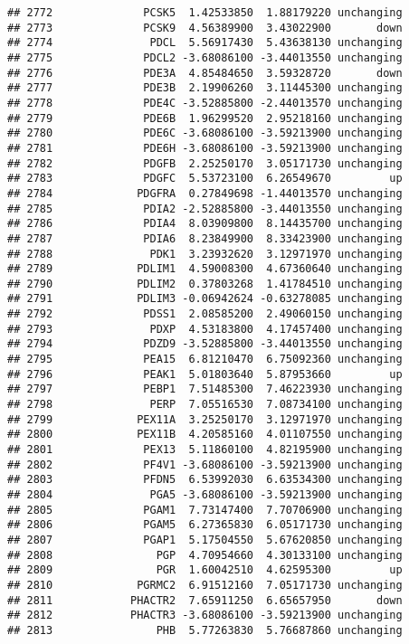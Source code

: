 \documentclass[]{article}
\begin{document}
\begin{verbatim}
## 2772              PCSK5  1.42533850  1.88179220 unchanging
## 2773              PCSK9  4.56389900  3.43022900       down
## 2774               PDCL  5.56917430  5.43638130 unchanging
## 2775              PDCL2 -3.68086100 -3.44013550 unchanging
## 2776              PDE3A  4.85484650  3.59328720       down
## 2777              PDE3B  2.19906260  3.11445300 unchanging
## 2778              PDE4C -3.52885800 -2.44013570 unchanging
## 2779              PDE6B  1.96299520  2.95218160 unchanging
## 2780              PDE6C -3.68086100 -3.59213900 unchanging
## 2781              PDE6H -3.68086100 -3.59213900 unchanging
## 2782              PDGFB  2.25250170  3.05171730 unchanging
## 2783              PDGFC  5.53723100  6.26549670         up
## 2784             PDGFRA  0.27849698 -1.44013570 unchanging
## 2785              PDIA2 -2.52885800 -3.44013550 unchanging
## 2786              PDIA4  8.03909800  8.14435700 unchanging
## 2787              PDIA6  8.23849900  8.33423900 unchanging
## 2788               PDK1  3.23932620  3.12971970 unchanging
## 2789             PDLIM1  4.59008300  4.67360640 unchanging
## 2790             PDLIM2  0.37803268  1.41784510 unchanging
## 2791             PDLIM3 -0.06942624 -0.63278085 unchanging
## 2792              PDSS1  2.08585200  2.49060150 unchanging
## 2793               PDXP  4.53183800  4.17457400 unchanging
## 2794              PDZD9 -3.52885800 -3.44013550 unchanging
## 2795              PEA15  6.81210470  6.75092360 unchanging
## 2796              PEAK1  5.01803640  5.87953660         up
## 2797              PEBP1  7.51485300  7.46223930 unchanging
## 2798               PERP  7.05516530  7.08734100 unchanging
## 2799             PEX11A  3.25250170  3.12971970 unchanging
## 2800             PEX11B  4.20585160  4.01107550 unchanging
## 2801              PEX13  5.11860100  4.82195900 unchanging
## 2802              PF4V1 -3.68086100 -3.59213900 unchanging
## 2803              PFDN5  6.53992030  6.63534300 unchanging
## 2804               PGA5 -3.68086100 -3.59213900 unchanging
## 2805              PGAM1  7.73147400  7.70706900 unchanging
## 2806              PGAM5  6.27365830  6.05171730 unchanging
## 2807              PGAP1  5.17504550  5.67620850 unchanging
## 2808                PGP  4.70954660  4.30133100 unchanging
## 2809                PGR  1.60042510  4.62595300         up
## 2810             PGRMC2  6.91512160  7.05171730 unchanging
## 2811            PHACTR2  7.65911250  6.65657950       down
## 2812            PHACTR3 -3.68086100 -3.59213900 unchanging
## 2813                PHB  5.77263830  5.76687860 unchanging

\end{verbatim}
\end{document}
